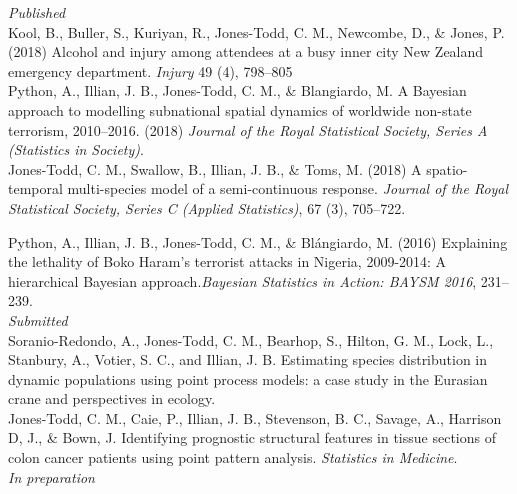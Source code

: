 \documentclass[10pt,a4paper]{moderncv}
\begin{document}
  \textit{\small{Published}}\\

\vspace{-3pt}
Kool, B., Buller, S., Kuriyan, R., Jones-Todd, C. M., Newcombe, D., \& Jones, P. (2018) Alcohol and injury among attendees at a busy inner city New Zealand emergency department. \textit{Injury} 49 (4), 798--805\\


\vspace{-3pt}
Python, A.,  Illian, J. B., Jones-Todd, C. M., \& Blangiardo, M. A Bayesian approach to modelling subnational spatial dynamics of worldwide non-state terrorism, 2010--2016. (2018) \textit{Journal of the Royal Statistical Society, Series  A (Statistics in Society)}.\\

  Jones-Todd, C. M., Swallow, B., Illian, J. B., \& Toms, M. (2018) A spatio-temporal multi-species model of a semi-continuous response. \textit{Journal of the Royal Statistical Society, Series C (Applied Statistics)}, 67 (3), 705--722.\\
\vspace{5pt}

\vspace{-3pt}
Python, A.,  Illian, J. B., Jones-Todd, C. M., \& Bl\'{a}ngiardo, M. (2016) Explaining the lethality of Boko Haram’s terrorist attacks in Nigeria, 2009-2014: A hierarchical Bayesian approach.\textit{Bayesian Statistics in Action: BAYSM 2016}, 231--239.\\


\textit{\small{Submitted}}\\

\vspace{-3pt}
Soranio-Redondo, A., Jones-Todd, C. M., Bearhop, S., Hilton, G. M., Lock, L., Stanbury, A., Votier, S. C., and Illian, J. B. Estimating species distribution in dynamic populations using point process models: a case study in the Eurasian crane and perspectives in ecology. \\

\vspace{-3pt}
Jones-Todd, C. M., Caie, P., Illian, J. B., Stevenson, B. C., Savage, A., Harrison D, J., \& Bown, J. Identifying prognostic structural features in tissue sections of colon cancer patients using point pattern analysis. \textit{Statistics in Medicine}.\\


\textit{\small{In preparation}}\\
\end{document}
